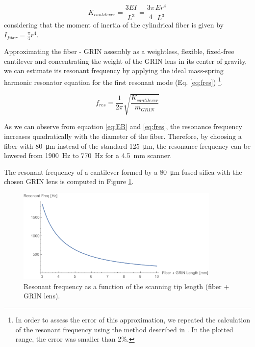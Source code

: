 \begin{equation}
K_{cantilever} = \frac{3 E I}{L^3} = \frac{3 \pi}{4} \frac{E r^4}{L^3}
\label{eq:EB}
\end{equation}
\noindent
considering that the moment of inertia of the cylindrical fiber is given by $I_{fiber} = \frac{\pi}{4} r^4$.

Approximating the fiber - GRIN assembly as a weightless, flexible, fixed-free cantilever and concentrating the weight of the GRIN lens in its center of gravity, we can estimate its resonant frequency by applying the ideal mass-spring harmonic resonator equation for the first resonant mode (Eq. \ref{eq:fres}) \footnote{In order to assess the error of this approximation, we repeated the calculation of the resonant frequency using the method described in \cite{Huo2010}. In the plotted range, the error was smaller than 2\%.}. 

\begin{equation}
f_{res} = \frac{1}{2 \pi} \sqrt{\frac{K_{cantilever}}{m_{\mathit{GRIN}}}} 
\label{eq:fres}
\end{equation}

As we can observe from equation \ref{eq:EB} and \ref{eq:fres}, the resonance frequency increases quadratically with the diameter of the fiber. Therefore, by choosing a fiber with \SI{80}{\micro\meter} instead of the standard \SI{125}{\micro\meter}, the resonance frequency can be lowered from \SI{1900}{\hertz} to \SI{770}{\hertz} for a \SI{4.5}{\milli\meter} scanner.

The resonant frequency of a cantilever formed by a \SI{80}{\micro\meter} fused silica with the chosen GRIN lens is computed in Figure \ref{fig:freq}.

\begin{figure}[h!]\centering
      \includegraphics[width=10cm]{figures/30_DesignSimulation/Mechanical/fres.pdf}
      \caption{Resonant frequency as a function of the scanning tip length (fiber + GRIN lens).}
      \label{fig:freq}
\end{figure}

